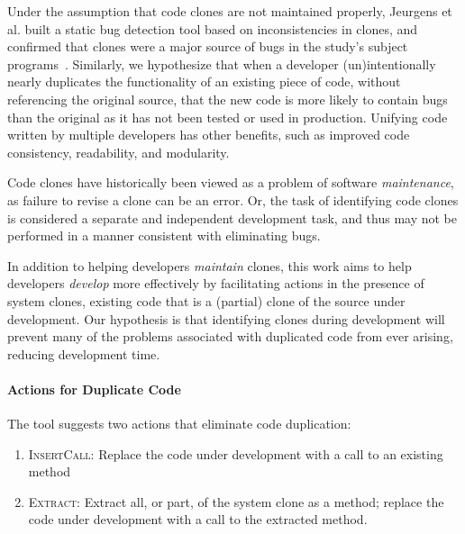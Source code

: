 \documentclass[nocopyrightspace,10pt]{sigplanconf}
\begin{document}

Under the assumption that code clones are not maintained properly,
Jeurgens et al. built a static bug detection tool based on
inconsistencies in clones, and confirmed that clones were a major
source of bugs in the study's subject programs~\cite{Juergens2009}.
Similarly, we hypothesize that when a developer (un)intentionally
nearly duplicates the functionality of an existing piece of code, without
referencing the original source, that the new code is more likely to
contain bugs than the original as it has not been tested or used in
production. Unifying code written by multiple developers has other 
benefits, such as improved code consistency, readability, and modularity.

Code clones have historically been viewed as a problem of software
\emph{maintenance}, as failure to revise a clone can be an error. 
Or, the task of identifying code clones is considered a separate and
independent development task, and thus may not be performed in a
manner consistent with eliminating bugs.

In addition to helping developers \emph{maintain} clones, this work
aims to help developers \emph{develop} more effectively by
facilitating actions in the presence of system clones, existing code
that is a (partial) clone of the source under development.  Our hypothesis
 is that identifying clones during development will prevent many of the problems
associated with duplicated code from ever arising, reducing development time.

\paragraph{Actions for Duplicate Code}

The tool suggests two actions that eliminate code duplication:

\begin{enumerate}
  \item \textsc{InsertCall}: Replace the code under development with a call to an existing method
  \item \textsc{Extract}: Extract all, or part, of the system clone as a method;
    replace the code under development with a call to the extracted
    method.
\end{enumerate}
\end{document}
